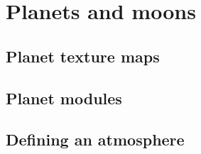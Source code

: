 \documentclass[Orbiter Developer Manual.tex]{subfiles}
\begin{document}
\section{Planets and moons}

\subsection{Planet texture maps}

\subsection{Planet modules}

\subsection{Defining an atmosphere}
\end{document}
